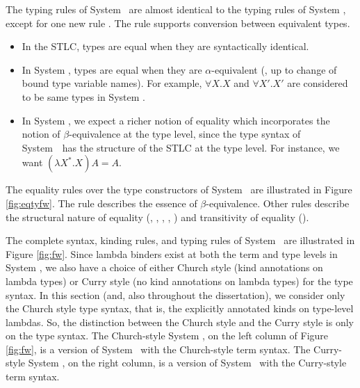 The typing rules of System \Fw\ are almost identical to the typing rules of
System \F, except for one new rule . The  rule
supports conversion between equivalent types.

\begin{itemize}
\item In the STLC, types are equal when they are syntactically identical.
\item In System \F, types are equal when they are $\alpha$-equivalent
(\ie, up to change of bound type variable names). For example,
$\forall X.X$ and $\forall X'.X'$ are considered to be same types in System \F.

\item
In System \Fw, we expect a richer notion of equality which incorporates
the notion of $\beta$-equivalence at the type level, since the type syntax of
System~\Fw\ has the structure of the STLC at the type level.
For instance, we want $(\lambda X^{*}.X) A = A$. 
\end{itemize}

The equality rules over the type constructors of System \Fw\ are
illustrated in Figure \ref{fig:eqtyfw}. The  rule
describes the essence of $\beta$-equivalence.
Other rules describe the structural nature of equality (,
, , , )
and transitivity of equality ().


The complete syntax, kinding rules, and typing rules of System \Fw\
are illustrated in Figure \ref{fig:fw}. Since lambda binders exist
at both the term and type levels in System \Fw, we also have a choice of
either Church style (kind annotations on lambda types) or
Curry style (no kind annotations on lambda types) for the type syntax.
In this section (and, also throughout the dissertation), we consider
only the Church style type syntax, that is, the explicitly annotated kinds
on type-level lambdas. So, the distinction between the Church style and
the Curry style is only on the type syntax. The Church-style System \Fw,
on the left column of Figure \ref{fig:fw}, is a version of System \Fw\ with
the Church-style term syntax. The Curry-style System \Fw, on the right column,
is a version of System \Fw\ with the Curry-style term syntax.

